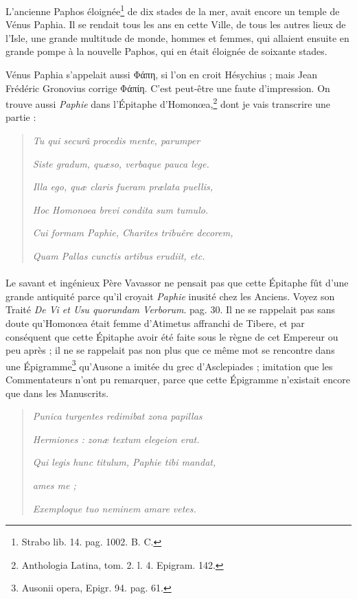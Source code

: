 \documentclass[a4paper, 11pt, oneside, polutonikogreek, french]{article}
\begin{document}
L'ancienne Paphos éloignée\footnote{Strabo lib. 14. pag. 1002. B. C.} de dix stades de la mer, avait encore un temple de Vénus Paphia. Il se rendait tous les ans en cette Ville, de tous les autres lieux de l'Isle, une grande multitude de monde, hommes et femmes, qui allaient ensuite en grande pompe à la nouvelle Paphos, qui en était éloignée de soixante stades.

Vénus Paphia s'appelait aussi Φάπη, si l'on en croit Hésychius ; mais Jean Frédéric Gronovius corrige Φάπίη. C'est peut-être une faute d'impression. On trouve aussi \emph{Paphie} dans l'Épitaphe d'Homonœa,\footnote{Anthologia Latina, tom. 2. l. 4. Epigram. 142.} dont je vais transcrire une partie :
\begin{quotation}
\emph{Tu qui securâ procedis mente, parumper}

\hspace*{5mm}\emph{Siste gradum, quæso, verbaque pauca lege.}

\emph{Illa ego, quæ claris fueram prælata puellis,}

\hspace*{5mm}\emph{Hoc Homonoea brevi condita sum tumulo.}

\emph{Cui formam Paphie, Charites tribuêre decorem,}

\hspace*{5mm}\emph{Quam Pallas cunctis artibus erudiit, etc.}
\end{quotation}
\paragraph{}
Le savant et ingénieux Père Vavassor ne pensait pas que cette Épitaphe fût d'une grande antiquité parce qu'il croyait \emph{Paphie} inusité chez les Anciens. Voyez son Traité \emph{De Vi et Usu quorundam Verborum}. pag. 30. Il ne se rappelait pas sans doute qu'Homonœa était femme d'Atimetus affranchi de Tibere, et par conséquent que cette Épitaphe avoir été faite sous le règne de cet Empereur ou peu après ; il ne se rappelait pas non plus que ce même mot se rencontre dans une Épigramme\footnote{Ausonii opera, Epigr. 94. pag. 61.} qu'Ausone a imitée du grec d'Asclepiades ; imitation que les Commentateurs n'ont pu remarquer, parce que cette Épigramme n'existait encore que dans les Manuscrits.
\begin{quotation}
\emph{Punica turgentes redimibat zona papillas}

\hspace*{5mm}\emph{Hermiones : zonæ textum elegeion erat.}

\emph{Qui legis hunc titulum, Paphie tibi mandat,}

\hspace*{15mm}\emph{ames me ;}

\hspace*{5mm}\emph{Exemploque tuo neminem amare vetes.}
\end{quotation}
\end{document}
